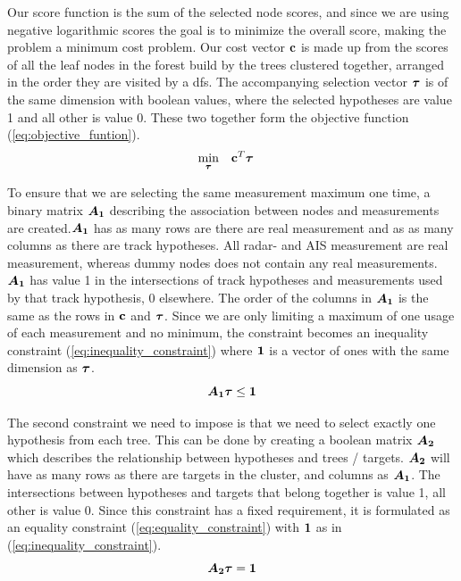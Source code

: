 Our score function is the sum of the selected node scores, and since we are using negative logarithmic scores the goal is to minimize the overall score, making the problem a minimum cost problem. Our cost vector \(\boldsymbol{\mathbf{c}}\) is made up from the scores of all the leaf nodes in the forest build by the trees clustered together, arranged in the order they are visited by a \gls{dfs}. The accompanying selection vector \( \boldsymbol{\mathbf{\tau}} \) is of the same dimension with boolean values, where the selected hypotheses are value 1 and all other is value 0. These two together form the objective function (\ref{eq:objective_funtion}).
\begin{equation}
\begin{aligned}
& \underset{\boldsymbol{\mathbf{\tau}}}{\text{min}}
& & \boldsymbol{\mathbf{c}}^T \boldsymbol{\mathbf{\tau}}
\end{aligned}
\label{eq:objective_funtion}
\end{equation}

To ensure that we are selecting the same measurement maximum one time, a binary matrix \( \bm{A_1} \) describing the association between nodes and measurements are created.\(\bm{A_1}\) has as many rows are there are real measurement and as as many columns as there are track hypotheses. All radar- and AIS measurement are real measurement, whereas dummy nodes does not contain any real measurements. \( \bm{A_1} \) has value 1 in the intersections of track hypotheses and measurements used by that track hypothesis, 0 elsewhere. The order of the columns in \( \bm{A_1} \) is the same as the rows in \( \boldsymbol{\mathbf{c}} \) and \( \boldsymbol{\mathbf{\tau}} \). Since we are only limiting a maximum of one usage of each measurement and no minimum, the constraint becomes an inequality constraint (\ref{eq:inequality_constraint}) where \( \boldsymbol{\mathbf{1}} \) is a vector of ones with the same dimension as \( \boldsymbol{\mathbf{\tau}} \).
\begin{equation}\label{eq:inequality_constraint}
\bm{A_1} \boldsymbol{\mathbf{\tau}} \leq \boldsymbol{\mathbf{1}}
\end{equation}

The second constraint we need to impose is that we need to select exactly one hypothesis from each tree. This can be done by creating a boolean matrix \( \bm{A_2} \) which describes the relationship between hypotheses and trees / targets. \( \bm{A_2} \) will have as many rows as there are targets in the cluster, and columns as \( \bm{A_1} \). The intersections between hypotheses and targets that belong together is value 1, all other is value 0. Since this constraint has a fixed requirement, it is formulated as an equality constraint (\ref{eq:equality_constraint}) with \( \boldsymbol{\mathbf{1}} \) as in (\ref{eq:inequality_constraint}).
\begin{equation}\label{eq:equality_constraint}
\bm{A_2} \boldsymbol{\mathbf{\tau}} = \boldsymbol{\mathbf{1}}
\end{equation}

